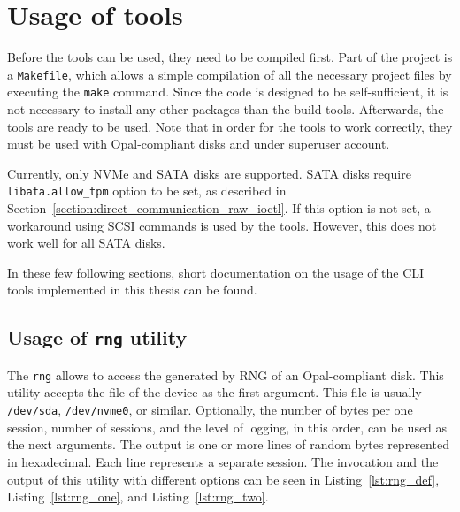 \appendix


\chapter{Usage of tools}
\label{appendix:usage}

Before the tools can be used, they need to be compiled first. Part of the project is a \verb|Makefile|, which allows a simple compilation of all the necessary project files by executing the \verb|make| command. Since the code is designed to be self-sufficient, it is not necessary to install any other packages than the build tools. Afterwards, the tools are ready to be used.
Note that in order for the tools to work correctly, they must be used with Opal-compliant disks and under superuser account.

Currently, only NVMe and SATA disks are supported. SATA disks require \verb|libata.allow_tpm| option to be set, as described in Section~\ref{section:direct_communication_raw_ioctl}. If this option is not set, a workaround using SCSI commands is used by the tools. However, this does not work well for all SATA disks.

In these few following sections, short documentation on the usage of the CLI tools implemented in this thesis can be found.



\section{Usage of \texttt{rng} utility}

The \verb|rng| allows to access the generated by RNG of an Opal-compliant disk.
This utility accepts the file of the device as the first argument. This file is usually \verb|/dev/sda|, \verb|/dev/nvme0|, or similar.
Optionally, the number of bytes per one session, number of sessions, and the level of logging, in this order, can be used as the next arguments.
The output is one or more lines of random bytes represented in hexadecimal. Each line represents a separate session. The invocation and the output of this utility with different options can be seen in Listing~\ref{lst:rng_def}, Listing~\ref{lst:rng_one}, and Listing~\ref{lst:rng_two}.




